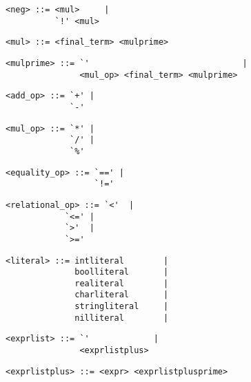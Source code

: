\begin{footnotesize}
\begin{lstlisting}[frame=single, label={neg}, language=pie]
<neg> ::= <mul>     |
          `!' <mul>
\end{lstlisting}

\begin{lstlisting}[frame=single, label={mul}, language=pie]
<mul> ::= <final_term> <mulprime>
\end{lstlisting}

\begin{lstlisting}[frame=single, label={mulprime}, language=pie]
<mulprime> ::= `'                               |
               <mul_op> <final_term> <mulprime>
\end{lstlisting}

\begin{lstlisting}[frame=single, label={add_op}, language=pie]
<add_op> ::= `+' |
             `-'
\end{lstlisting}

\begin{lstlisting}[frame=single, label={mul_op}, language=pie]
<mul_op> ::= `*' |
             `/' |
             `%'
\end{lstlisting}

\begin{lstlisting}[frame=single, label={equality_op}, language=pie]
<equality_op> ::= `==' |
                  `!='
\end{lstlisting}

\begin{lstlisting}[frame=single, label={relational_op}, language=pie]
<relational_op> ::= `<'  |
	   	    `<=' |
		    `>'  |
		    `>='
\end{lstlisting}

\begin{lstlisting}[frame=single, label={literal}, language=pie]
<literal> ::= intliteral        |
              boolliteral       |
              realiteral        |
              charliteral       |
              stringliteral     |
              nilliteral		|
\end{lstlisting}

\begin{lstlisting}[frame=single, label={exprlist}, language=pie]
<exprlist> ::= `'             |
               <exprlistplus>
\end{lstlisting}

\begin{lstlisting}[frame=single, label={exprlistplus}, language=pie]
<exprlistplus> ::= <expr> <exprlistplusprime>
\end{lstlisting}


\end{footnotesize}

